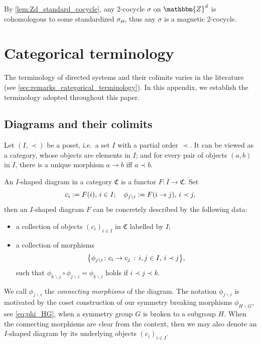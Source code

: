 \documentclass{amsart}
\numberwithin{figure}{section}
\numberwithin{equation}{section}
\numberwithin{table}{section}
\theoremstyle{plain}
\theoremstyle{definition}
\theoremstyle{remark}
\theoremstyle{nonumber}
\newcommand{\Z}{\mathbb{Z}}
\newcommand{\defeq}{\mathrel{\vcentcolon=}}
\renewcommand{\mathbb}{\mathbbm} %
\DeclarePairedDelimiter{\set}{\lbrace}{\rbrace} %
\begin{document}
By \cref{lem:Zd_standard_cocycle}, any 2-cocycle $\sigma$ on $\Z^d$ is cohomologous to some standardized $\sigma_\Theta$, thus any $\sigma$ is a magnetic 2-cocycle.


\section{Categorical terminology}
\label{app:categorical_terminology}

The terminology of directed systems and their
colimits varies in the literature (see
\cref{sec:remarks_categorical_terminology}). In this appendix, we
establish the terminology adopted throughout this paper.

\subsection{Diagrams and their colimits}
Let \( (I,\prec) \) be a poset, i.e.~a set \( I \)
with a partial order \( \prec \). It can be viewed as a category, whose
objects are elements in \( I \); and for every pair of objects
\( (a,b) \) in \( I \), there is a unique morphism \( a\to b \) iff
\( a\prec b \). 

An \( I \)-shaped diagram in a category \(
\mathfrak{C} \) is a functor \( F\colon I\to\mathfrak{C} \).   
Set
\[ 
  c_i\defeq F(i),\,i\in I;\quad 
  \phi_{j\backslash i}\defeq F(i\to j),\,i\prec j,
\]
then an \( I \)-shaped diagram \( F \) can
be concretely described by the following data:
\begin{itemize}
\item a collection of objects \( (c_i)_{i\in I} \) in
\( \mathfrak{C} \) labelled by \( I \);
\item a collection of morphisms
\[ 
  \set*{\phi_{j\backslash i}\colon c_i\to c_j\,:\,i,j\in I,\,i\prec
  j},
\]
such that \( \phi_{k\backslash  j}\circ\phi_{j\backslash
i}=\phi_{k\backslash i} \) holds if \( i\prec j\prec k \). 
\end{itemize}
We call \( \phi_{j\backslash i} \) the \emph{connecting
morphisms} of the diagram. 
The notation $\phi_{j\backslash i}$ is motivated by the coset construction
of our symmetry breaking morphisms $\phi_{H\backslash G}$, see
\eqref{eq:phi_HG}, when a symmetry group $G$ is broken to a subgroup $H$.
When the connecting morphisms are clear from the context, then we may also
denote an \( I \)-shaped diagram by its underlying objects \( (c_i)_{i\in
I} \). 
\end{document}
